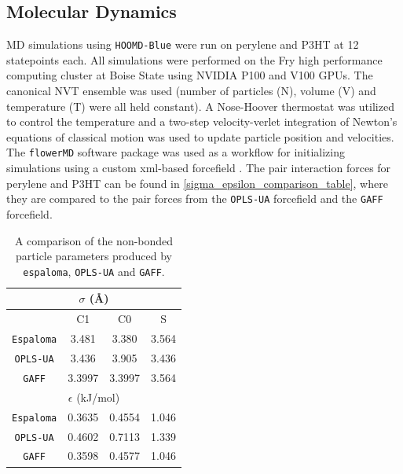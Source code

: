 \subsection{Molecular Dynamics}
MD simulations using \texttt{HOOMD-Blue} were run on perylene and P3HT at 12 statepoints each. All simulations were performed on the Fry high performance computing cluster at Boise State using NVIDIA P100 and V100 GPUs. The canonical NVT ensemble was used (number of particles (N), volume (V) and temperature (T) were all held constant). A Nose-Hoover thermostat was utilized to control the temperature and a two-step velocity-verlet integration of Newton's equations of classical motion was used to update particle position and velocities. The \texttt{flowerMD} software package was used as a workflow for initializing simulations using a custom xml-based forcefield \citep{Albooyeh2023, gmso}. The pair interaction forces for perylene and P3HT can be found in \autoref{sigma_epsilon_comparison_table}, where they are compared to the pair forces from the \texttt{OPLS-UA} forcefield and the \texttt{GAFF} forcefield. 
\begin{table}[b!]
    \centering
    \begin{tabular}{c c|c|c}
        \multicolumn{4}{c}{$\sigma$ (\AA)}        \\
        \hline
                    &   C1      &   C0      &   S       \\
        \hline
        \texttt{Espaloma}    &   3.481   &   3.380   &   3.564   \\
        \texttt{OPLS-UA}     &   3.436   &   3.905   &   3.436   \\
        \texttt{GAFF}        &   3.3997  &   3.3997  &   3.564 \\

        \multicolumn{4}{c}{$\epsilon$ (kJ/mol)}         \\
        \hline
        \texttt{Espaloma}    &   0.3635  &   0.4554  &   1.046   \\
        \texttt{OPLS-UA}     &   0.4602  &   0.7113  &   1.339   \\
        \texttt{GAFF}        &   0.3598  &   0.4577  &   1.046   \\
    \end{tabular}
    \caption{A comparison of the non-bonded particle parameters produced by \texttt{espaloma}, \texttt{OPLS-UA} and \texttt{GAFF}.}
    \label{sigma_epsilon_comparison_table}
\end{table}
